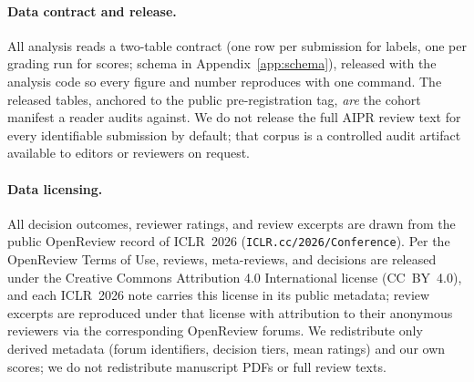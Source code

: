 \begin{table}[t]
  \centering
  \caption{Realized sample. Cohort $M$ (GPT-5.4-mini) carries the statistical power; the
  nested cohort $H$ (GPT-5.4) carries the production model. Both run the full two-pass
  pipeline. Counts exclude pre-registered exclusions.}
  \label{tab:sample}
  
\end{table}

\paragraph{Data contract and release.}
All analysis reads a two-table contract (one row per submission for labels, one per
grading run for scores; schema in Appendix~\ref{app:schema}), released with the analysis
code so every figure and number reproduces with one command. The released tables,
anchored to the public pre-registration tag, \emph{are} the cohort manifest a reader
audits against. We do not release the full AIPR review text for every identifiable
submission by default; that corpus is a controlled audit artifact available to editors
or reviewers on request.

\paragraph{Data licensing.}
All decision outcomes, reviewer ratings, and review excerpts are drawn from the public
OpenReview record of ICLR~2026 (\texttt{ICLR.cc/2026/Conference}). Per the OpenReview
Terms of Use, reviews, meta-reviews, and decisions are released under the Creative
Commons Attribution 4.0 International license (CC~BY~4.0), and each ICLR~2026 note
carries this license in its public metadata; review excerpts are reproduced under that
license with attribution to their anonymous reviewers via the corresponding OpenReview
forums. We redistribute only derived metadata (forum identifiers, decision tiers, mean
ratings) and our own scores; we do not redistribute manuscript PDFs or full review
texts.
